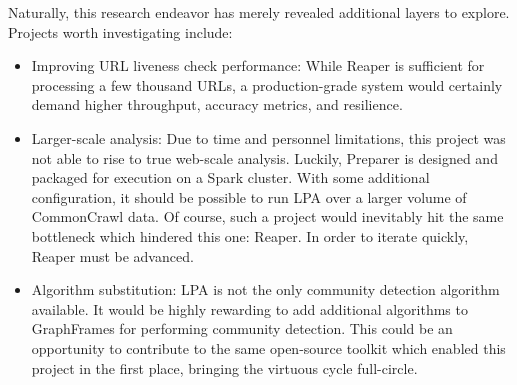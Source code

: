 \documentclass[conference]{IEEEtran}
\begin{document}
Naturally, this research endeavor has merely revealed additional layers to explore. Projects worth investigating include:
\begin{itemize}
	\item Improving URL liveness check performance: While Reaper is sufficient for processing a few thousand URLs, a production-grade system would certainly demand higher throughput, accuracy metrics, and resilience.
	\item Larger-scale analysis: Due to time and personnel limitations, this project was not able to rise to true web-scale analysis. Luckily, Preparer is designed and packaged for execution on a Spark cluster. With some additional configuration, it should be possible to run LPA over a larger volume of CommonCrawl data. Of course, such a project would inevitably hit the same bottleneck which hindered this one: Reaper. In order to iterate quickly, Reaper must be advanced.
	\item Algorithm substitution: LPA is not the only community detection algorithm available. It would be highly rewarding to add additional algorithms to GraphFrames for performing community detection. This could be an opportunity to contribute to the same open-source toolkit which enabled this project in the first place, bringing the virtuous cycle full-circle.
\end{itemize}



\end{document}
